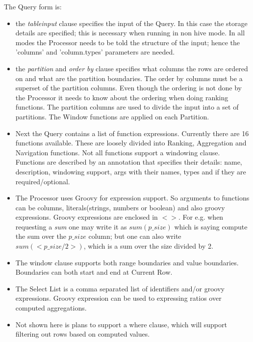 \documentclass[pdftex,10pt,a4paper]{article}
\begin{document}
  The Query form is:
  \begin{itemize}
  \item the {\em tableinput} clause specifies the input of the Query. In this case the storage details are specified; this is necessary when running in non hive mode. In all modes the Processor needs to be told the structure of the input; hence the 'columns' and 'column.types'  parameters are needed.
  \item the {\em partition} and {\em order by} clause specifies what columns the rows are ordered on and what are the partition boundaries. The order by columns must be a superset of the partition columns. Even though the ordering is not done by the Processor it needs to know about the ordering when doing ranking functions. The partition columns are used to divide the input into a set of partitions. The Window functions are applied on each Partition.
  \item Next the Query contains a list of function expressions. Currently there are 16 functions available. These are loosely  divided into Ranking, Aggregation and Navigation functions. Not all functions support a windowing clause. Functions are described by an annotation that specifies their details: name, description, windowing support, args with their names, types and if they are required/optional.
  \item The Processor uses Groovy for expression support. So arguments to functions can be columns, literals(strings, numbers or boolean) and also groovy expressions. Groovy expressions are enclosed in $<>$. For e.g. when requesting a {\em sum} one may write it as $sum(p\_size)$ which is saying compute the sum over the $p\_size$ column; but one can also write $sum(<p\_size/2>)$, which is a sum over the size divided by 2.
  \item The window clause supports both range boundaries and value boundaries. Boundaries can both start and end at Current Row.
  \item The Select List is a comma separated list of identifiers and/or groovy expressions. Groovy expression can be used to expressing ratios over computed aggregations.
  \item Not shown here is plans to support a where clause, which will support filtering out rows based on computed values.
  \end{itemize}
  
\end{document}
